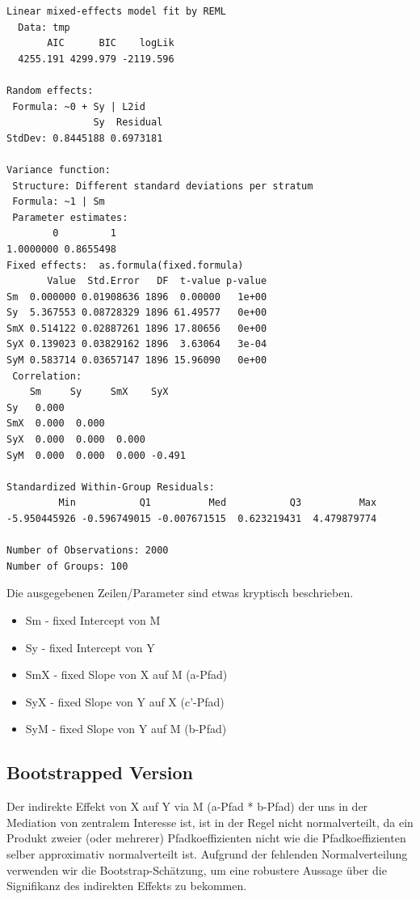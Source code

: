 \documentclass[
  letterpaper,
  DIV=11,
  numbers=noendperiod]{scrreprt}
\providecommand{\tightlist}{%
  \setlength{\itemsep}{0pt}\setlength{\parskip}{0pt}}\usepackage{longtable,booktabs,array}
\begin{document}
\begin{verbatim}
Linear mixed-effects model fit by REML
  Data: tmp 
       AIC      BIC    logLik
  4255.191 4299.979 -2119.596

Random effects:
 Formula: ~0 + Sy | L2id
               Sy  Residual
StdDev: 0.8445188 0.6973181

Variance function:
 Structure: Different standard deviations per stratum
 Formula: ~1 | Sm 
 Parameter estimates:
        0         1 
1.0000000 0.8655498 
Fixed effects:  as.formula(fixed.formula) 
       Value  Std.Error   DF  t-value p-value
Sm  0.000000 0.01908636 1896  0.00000   1e+00
Sy  5.367553 0.08728329 1896 61.49577   0e+00
SmX 0.514122 0.02887261 1896 17.80656   0e+00
SyX 0.139023 0.03829162 1896  3.63064   3e-04
SyM 0.583714 0.03657147 1896 15.96090   0e+00
 Correlation: 
    Sm     Sy     SmX    SyX   
Sy   0.000                     
SmX  0.000  0.000              
SyX  0.000  0.000  0.000       
SyM  0.000  0.000  0.000 -0.491

Standardized Within-Group Residuals:
         Min           Q1          Med           Q3          Max 
-5.950445926 -0.596749015 -0.007671515  0.623219431  4.479879774 

Number of Observations: 2000
Number of Groups: 100 
\end{verbatim}

Die ausgegebenen Zeilen/Parameter sind etwas kryptisch beschrieben.

\begin{itemize}
\tightlist
\item
  Sm - fixed Intercept von M
\item
  Sy - fixed Intercept von Y
\item
  SmX - fixed Slope von X auf M (a-Pfad)
\item
  SyX - fixed Slope von Y auf X (c'-Pfad)
\item
  SyM - fixed Slope von Y auf M (b-Pfad)
\end{itemize}

\subsection{Bootstrapped Version}\label{bootstrapped-version}

Der indirekte Effekt von X auf Y via M (a-Pfad * b-Pfad) der uns in der
Mediation von zentralem Interesse ist, ist in der Regel nicht
normalverteilt, da ein Produkt zweier (oder mehrerer) Pfadkoeffizienten
nicht wie die Pfadkoeffizienten selber approximativ normalverteilt ist.
Aufgrund der fehlenden Normalverteilung verwenden wir die
Bootstrap-Schätzung, um eine robustere Aussage über die Signifikanz des
indirekten Effekts zu bekommen.
\end{document}
